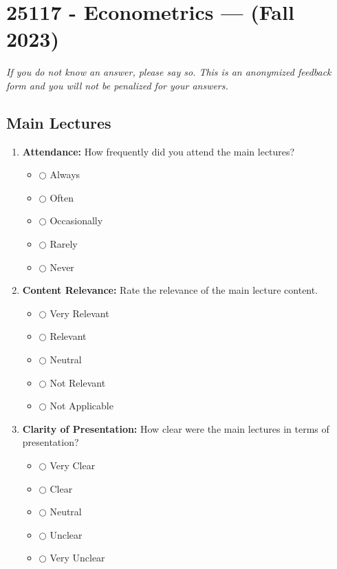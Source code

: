 \documentclass[a4paper,12pt]{article}
\begin{document}
\section*{25117 - Econometrics --- (Fall 2023)}
\small{\textit{If you do not know an answer, please say so. This is an anonymized feedback form and you will not be penalized for your answers.}}
\vspace{.9cm}
\subsection*{Main Lectures}

\begin{enumerate}[label=\textbf{\arabic*.}]
    \item \textbf{Attendance:} How frequently did you attend the main lectures?
    \begin{itemize}
        \item[] $\bigcirc$ Always
        \item[] $\bigcirc$ Often
        \item[] $\bigcirc$ Occasionally
        \item[] $\bigcirc$ Rarely
        \item[] $\bigcirc$ Never
    \end{itemize}

    \item \textbf{Content Relevance:} Rate the relevance of the main lecture content.
    \begin{itemize}
        \item[] $\bigcirc$ Very Relevant
        \item[] $\bigcirc$ Relevant
        \item[] $\bigcirc$ Neutral
        \item[] $\bigcirc$ Not Relevant
        \item[] $\bigcirc$ Not Applicable
    \end{itemize}

    \item \textbf{Clarity of Presentation:} How clear were the main lectures in terms of presentation?
    \begin{itemize}
        \item[] $\bigcirc$ Very Clear
        \item[] $\bigcirc$ Clear
        \item[] $\bigcirc$ Neutral
        \item[] $\bigcirc$ Unclear
        \item[] $\bigcirc$ Very Unclear
    \end{itemize}


\end{enumerate}
\end{document}
